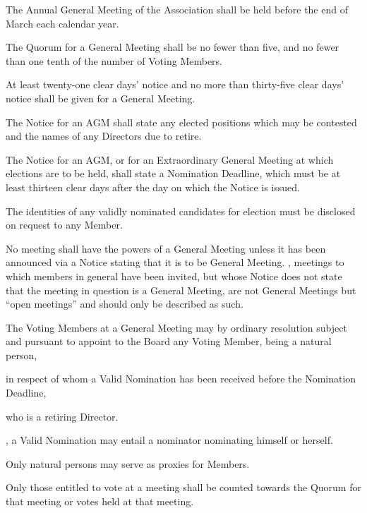 \documentclass[10pt]{mk-articles-of-association}
\newcommand{\EC}[0]{Board}
\newcommand{\Exec}[0]{\EC{} }
\begin{document}
\begin{constenum}

  \item The Annual General Meeting of the Association shall be
    held before the end of March each calendar year.\label{agmschedule}

  \item The Quorum for a General Meeting shall be no fewer than five, and
    no fewer than one tenth of the number of Voting Members.\label{quorum}

  \item At least twenty-one clear days' notice and no more than
    thirty-five clear days' notice shall be given for a General
    Meeting.

  \item The Notice for an AGM shall state any elected positions which
    may be contested and the names of any Directors due to retire.

  \item The Notice for an AGM, or for an Extraordinary General Meeting
    at which elections are to be held, shall state a Nomination
    Deadline, which must be at least thirteen clear days after the day
    on which the Notice is issued.

  \item The identities of any validly nominated candidates for
    election must be disclosed on request to any Member.

  \item No meeting shall have the powers of a General Meeting unless
    it has been announced via a Notice stating that it is to be
    General Meeting.  \avoiddoubt, meetings to which members in
    general have been invited, but whose Notice does not state that
    the meeting in question is a General Meeting, are not General
    Meetings but ``open meetings'' and should only be described as such.

  \item The Voting Members at a General Meeting may by ordinary
    resolution subject and pursuant to 
    appoint to the \Exec any Voting Member, being a natural person,
    \begin{constenum}
      \item in respect of whom a Valid Nomination has been received
        before the Nomination Deadline, \ITor
      \item who is a retiring Director.
    \end{constenum}

  \item \avoiddoubt, a Valid Nomination may entail a nominator nominating
    himself or herself.

  \item Only natural persons may serve as proxies for Members.

  \item Only those entitled to vote at a meeting shall be counted towards
    the Quorum for that meeting or votes held at that meeting.

\end{constenum}
\end{document}
